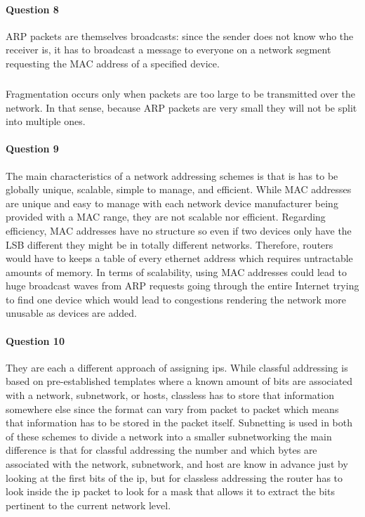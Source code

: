 \documentclass[12pt]{article}
\begin{document}
\paragraph*{Question 8}
ARP packets are themselves broadcasts: since the sender does not know who the receiver is, it has
to broadcast a message to everyone on a network segment requesting the MAC address of a specified
device.

\subparagraph*{}
Fragmentation occurs only when packets are too large to be transmitted over the network. In that
sense, because ARP packets are very small they will not be split into multiple ones.

\pagebreak

\paragraph*{Question 9}
The main characteristics of a network addressing schemes is that is has to be globally unique,
scalable, simple to manage, and efficient. While MAC addresses are unique and easy to manage
with each network device manufacturer being provided with a MAC range, they are not scalable
nor efficient. Regarding efficiency, MAC addresses have no structure so even if two devices
only have the LSB different they might be in totally different networks. Therefore, routers would
have to keeps a table of every ethernet address which requires untractable amounts of memory. In
terms of scalability, using MAC addresses could lead to huge broadcast waves from ARP requests
going through the entire Internet trying to find one device which would lead to congestions
rendering the network more unusable as devices are added.

\paragraph*{Question 10}
They are each a different approach of assigning ips. While classful addressing is based on pre-established
templates where a known amount of bits are associated with a network, subnetwork, or hosts, classless
has to store that information somewhere else since the format can vary from packet to packet which means
that information has to be stored in the packet itself. Subnetting is used in both of these schemes to
divide a network into a smaller subnetworking the main difference is that for classful addressing
the number and which bytes are associated with the network, subnetwork, and host are know in advance
just by looking at the first bits of the ip, but for classless addressing the router has to look inside
the ip packet to look for a mask that allows it to extract the bits pertinent to the current network
level.
\end{document}
